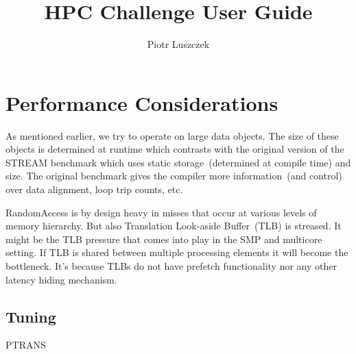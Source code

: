 \documentclass[twocolumn]{report}
\newcommand{\STREAM}{\textsf{STREAM}\xspace}
\newcommand{\RANDA}{\textsf{RandomAccess}\xspace}
\newcommand{\PTRANS}{\textsf{PTRANS}\xspace}
\begin{document}
\title{HPC Challenge User Guide}
\author{Piotr Luszczek}
\maketitile

\chapter{Performance Considerations}

As mentioned earlier, we try to operate on large data objects. The
size of these objects is determined at runtime which contrasts with
the original version of the \STREAM benchmark which uses static
storage~(determined at compile time) and size. The original benchmark
gives the compiler more information~(and control) over data alignment,
loop trip counts, etc.

\RANDA is by design heavy in misses that occur at various levels of
memory hierarchy. But also Translation Look-aside Buffer~(TLB) is
streased. It might be the TLB pressure that comes into play in the SMP
and multicore setting. If TLB is shared between multiple processing
elements it will become the bottleneck. It's because TLBs do not have
prefetch functionality nor any other latency hiding mechanism.

\section{Tuning}

\PTRANS
\end{document}
